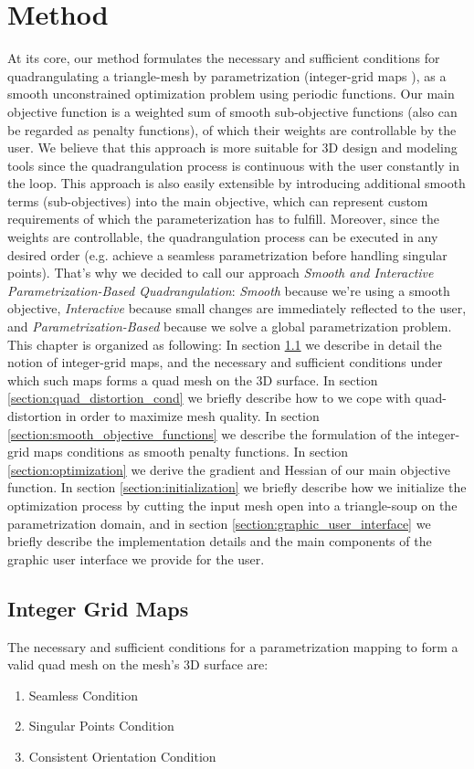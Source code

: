 \chapter{Method}
\label{chapter:method}
At its core, our method formulates the necessary and sufficient conditions for quadrangulating a triangle-mesh by parametrization (integer-grid maps \cite{bommes:hal-00862648}), as a smooth unconstrained optimization problem using periodic functions. Our main objective function is a weighted sum of smooth sub-objective functions (also can be regarded as penalty functions), of which their weights are controllable by the user. We believe that this approach is more suitable for 3D design and modeling tools since the quadrangulation process is continuous with the user constantly in the loop. This approach is also easily extensible by introducing additional smooth terms (sub-objectives) into the main objective, which can represent custom requirements of which the parameterization has to fulfill. Moreover, since the weights are controllable, the quadrangulation process can be executed in any desired order (e.g. achieve a seamless parametrization before handling singular points). That's why we decided to call our approach \emph{Smooth and Interactive Parametrization-Based Quadrangulation}: \emph{Smooth} because we're using a smooth objective, \emph{Interactive} because small changes are immediately reflected to the user, and \emph{Parametrization-Based} because we solve a global parametrization problem. This chapter is organized as following: In section \ref{integer-grid-maps} we describe in detail the notion of integer-grid maps, and the necessary and sufficient conditions under which such maps forms a quad mesh on the 3D surface. In section \ref{section:quad_distortion_cond} we briefly describe how to we cope with quad-distortion in order to maximize mesh quality. In section \ref{section:smooth_objective_functions} we describe the formulation of the integer-grid maps conditions as smooth penalty functions. In section \ref{section:optimization} we derive the gradient and Hessian of our main objective function. In section \ref{section:initialization} we briefly describe how we initialize the optimization process by cutting the input mesh open into a triangle-soup on the parametrization domain, and in section \ref{section:graphic_user_interface} we briefly describe the implementation details and the main components of the graphic user interface we provide for the user.
\section{Integer Grid Maps}
\label{integer-grid-maps}
The necessary and sufficient conditions for a parametrization mapping to form a valid quad mesh on the mesh's 3D surface are:
\begin{enumerate}
\item Seamless Condition
\item Singular Points Condition
\item Consistent Orientation Condition
\end{enumerate}
